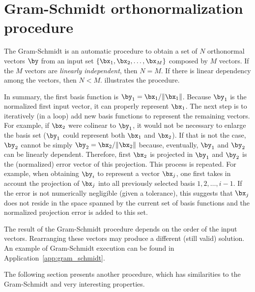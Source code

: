 \section{Gram-Schmidt orthonormalization procedure}
\label{sec:Gram-Schmidt}

The Gram-Schmidt is an automatic procedure to obtain a set of $N$ orthonormal vectors $\by$ from an input set $\{\bx_1,\bx_2,\ldots,\bx_M\}$ composed by $M$ vectors. 
If the $M$ vectors are \emph{linearly independent}, then $N=M$. If there is linear dependency among the vectors, then $N<M$.  illustrates the procedure. %

In summary, the first basis function is $\by_1 = \bx_1 / \lVert\bx_1\rVert$. Because $\by_1$ is the normalized first input vector, it can properly represent $\bx_1$. The next step is to iteratively (in a loop) add new basis functions to represent the remaining vectors. For example, if $\bx_2$ were colinear to $\by_1$, it would not be necessary to enlarge the basis set ($\by_1$ could represent both $\bx_1$ and $\bx_2$). If that is not the case, $\by_2$ cannot be simply $\by_2 = \bx_2/\lVert\bx_2\rVert$ because, eventually, $\by_1$ and $\by_2$ can be linearly dependent. Therefore, first $\bx_2$ is projected in $\by_1$ and $\by_2$ is the (normalized) error vector of this projection. This process is repeated. For example, when obtaining $\by_i$ to represent a vector $\bx_j$, one first takes in account the projection of $\bx_j$ into all previously selected basis $1,2,\ldots,i-1$. If the  error is not numerically negligible (given a tolerance), this suggests that $\bx_j$ does not reside in the space spanned by the current set of basis functions and the normalized projection error is added to this set.



The result of the Gram-Schmidt procedure depends on the order of the input vectors. Rearranging these vectors may produce a different (still valid) solution. 
An example of Gram-Schmidt execution can be found in Application~\ref{app:gram_schmidt}.

The following section presents another procedure, which has similarities to the Gram-Schmidt and very interesting properties.

